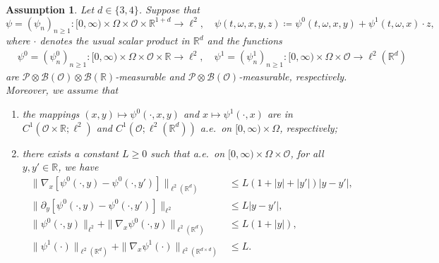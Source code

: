 \documentclass[10pt,a4paper]{amsart}
\newtheorem{assumption}{Assumption}
\newcommand{\R}{\mathbb{R}}
\newcommand{\ce}{\coloneqq}
\newcommand{\sB}{\mathscr{B}}
\newcommand{\sO}{\mathscr{O}}
\newcommand{\sP}{\mathscr{P}}
\begin{document}
\begin{assumption}\label{assumption_weakened_setting}
  Let $d\in \{3,4 \}$. Suppose that 
  \begin{equation*}
      \psi=(\psi_n)_{n\geq 1}:[0,\infty)\times \Omega\times\sO\times \R^{1+d}\to \ell^2,\quad \psi(t,\omega,x,y,z) \ce \psi^0(t,\omega,x,y)+\psi^1(t,\omega,x) \cdot z,
  \end{equation*}
  where $\cdot$ denotes the usual scalar product in $\R^d$ and the functions
 \begin{align*}
     &\psi^0=(\psi^0_n)_{n\geq 1}:[0,\infty)\times \Omega\times\sO\times \R\to \ell^2,\quad
     \psi^1=(\psi^1_n)_{n\geq 1}:[0,\infty)\times \Omega\times\sO\to \ell^2(\R^d)
 \end{align*}
 are $\sP \otimes \sB(\sO)\otimes \sB(\R)$-measurable and $\sP \otimes \sB(\sO)$-measurable, respectively.
 Moreover, we assume that 
\begin{enumerate}
    \item the mappings  $(x,y)\mapsto \psi^0(\cdot,x,y)$ and $x\mapsto \psi^1(\cdot,x)$  are in $C^1(\sO\times \R;\ell^2)$ and $C^1(\sO;\ell^2(\R^d))$  a.e.\ on $[0,\infty)\times \Omega$, respectively;
    \item  there exists a constant $L\geq0$ such that a.e.\ on
    $[0, \infty)\times\Omega\times\sO$, for all $y,y'\in\R$, we have
    \begin{align}
        \|\nabla_x[
            \psi^0(\cdot,y)-\psi^0(\cdot,y')
        ]\|_{\ell^2(\R^d)}
        &\leq L(1+|y|+|y'|)|y-y'|, \label{eq:psi0-gradx-local-lipschitz}
        \\
                \|\partial_y[
            \psi^0(\cdot,y)-\psi^0(\cdot,y')
        ]\|_{\ell^2}
        &\leq L|y-y'|, \label{eq:psi0-dy-lipschitz}
        \\
        \|\psi^0(\cdot,y)\|_{\ell^2}+ \|\nabla_x\psi^0(\cdot,y)\|_{\ell^2(\R^d)}
        &\leq L(1+|y|), \label{eq:psi0-linear-growth}
        \\
        \|\psi^1(\cdot)\|_{\ell^2(\R^d)}
        +
        \|\nabla_x\psi^1(\cdot)\|_{\ell^2(\R^{d\times d})}
        &\leq L. \label{eq:psi1-uniform-bound}
    \end{align}
\end{enumerate}
\end{assumption}
\end{document}
